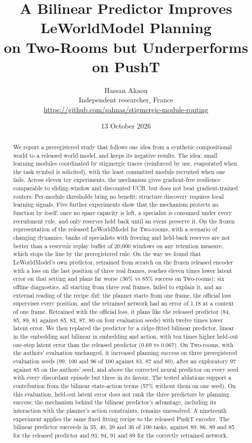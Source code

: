 \documentclass[11pt,a4paper]{article}
\title{A Bilinear Predictor Improves LeWorldModel Planning\\on Two-Rooms but Underperforms on PushT}
\author{Hassan Akaou\\
\small Independent researcher, France\\
\small \url{https://github.com/sahnas/stigmergic-module-routing}}
\date{13 October 2026}
\begin{document}
\maketitle

\begin{abstract}
We report a preregistered study that follows one idea from a synthetic compositional world to a released world model, and keeps its negative results. The idea: small learning modules coordinated by stigmergic traces (reinforced by use, evaporated when the task symbol is solicited), with the least committed module recruited when one fails. Across eleven toy experiments, the mechanism gives gradient-free resilience comparable to sliding-window and discounted UCB, but does not beat gradient-trained routers. Per-module thresholds bring no benefit; structure discovery requires local learning signals. Five further experiments show that the mechanism protects no function by itself: once no spare capacity is left, a specialist is consumed under every recruitment rule, and only reserves held back until an event preserve it. On the frozen representation of the released LeWorldModel for Two-rooms, with a scenario of changing dynamics, banks of specialists with freezing and held-back reserves are not better than a reservoir replay buffer of 20,000 windows on any retention measure, which stops the line by the preregistered rule. On the way we found that LeWorldModel's own predictor, retrained from scratch on the frozen released encoder with a loss on the last position of three real frames, reaches eleven times lower latent error on that setting and plans far worse (36\% vs 85\% success on Two-rooms); six offline diagnostics, all starting from three real frames, failed to explain it, and an external reading of the recipe did: the planner starts from one frame, the official loss supervises every position, and the retrained network had an error of 1.18 at a context of one frame. Retrained with the official loss, it plans like the released predictor (84, 85, 89, 81 against 85, 83, 87, 80 on four evaluation seeds) with twelve times lower latent error. We then replaced the predictor by a ridge-fitted bilinear predictor, linear in the embedding and bilinear in embedding and action, with ten times higher held-out one-step latent error than the released predictor (0.69 vs 0.067). On Two-rooms, with the authors' evaluation unchanged, it increased planning success on three preregistered evaluation seeds (99, 100 and 96 of 100 against 83, 87 and 80), after an exploratory 97 against 85 on the authors' seed, and above the corrected neural predictor on every seed with every discordant episode but three in its favour. The tested ablations support a contribution from the bilinear state-action terms (57\% without them on one seed). On this evaluation, held-out latent error does not rank the three predictors by planning success; the mechanism behind the bilinear predictor's advantage, including its interaction with the planner's action constraints, remains unresolved. A nineteenth experiment applies the same fixed fitting recipe to the released PushT encoder. The bilinear predictor succeeds in 35, 40, 39 and 36 of 100 tasks, against 89, 86, 89 and 85 for the released predictor and 93, 94, 91 and 89 for the correctly retrained network. 
\end{abstract}
\end{document}
